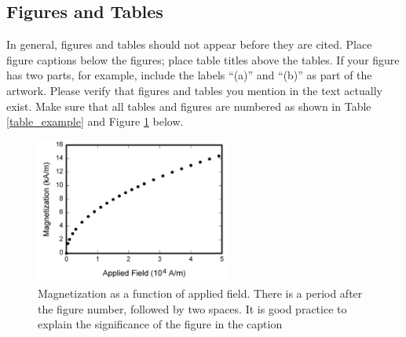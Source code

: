 \documentclass[10pt,journal,compsoc]{IEEEtran}
\begin{document}
\subsection{Figures and Tables}
In general, figures and tables should not appear before they are cited. Place figure captions below the figures; place table titles above the tables. If your figure has two parts, for example, include the labels “(a)” and “(b)” as part of the artwork. Please verify that figures and tables you mention in the text actually exist. Make sure that all tables and figures are numbered as shown in Table \ref{table_example} and Figure \ref{fig:my_label} below.

\begin{figure}[!h]
    \centering
    \includegraphics[width=2.5in]{Figure1-template.png}
    \caption{Magnetization as a function of applied field. There is a period after the figure number, followed by two spaces. It is good practice to explain the significance of the figure in the caption}
    \label{fig:my_label}
\end{figure}

%
%
\end{document}
